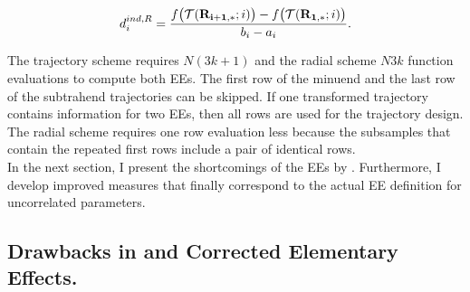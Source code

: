 \documentclass[a4paper,12pt]{article}
\begin{document}
\begin{align}
d_i^{ind, R} = \frac{f\big(\mathcal{T}(\bold{R_{i+1,*}}; i)\big) - f\big(\mathcal{T}(\bold{R_{1,*}}; i)\big)}{b_i - a_i}.
\end{align}

\noindent
The trajectory scheme requires $N(3k+1)$ and the radial scheme $N3k$ function evaluations to compute both EEs. The first row of the minuend and the last row of the subtrahend trajectories can be skipped. If one transformed trajectory contains information for two EEs, then all rows are used for the trajectory design. The radial scheme requires one row evaluation less because the subsamples that contain the repeated first rows include a pair of identical rows.\\

\noindent
In the next section, I present the shortcomings of the EEs by \cite{ge2017extending}. 
Furthermore, I develop improved measures that finally correspond to the actual EE definition for uncorrelated parameters.


\subsection{Drawbacks in \cite{ge2017extending} and Corrected Elementary Effects.}
\end{document}
